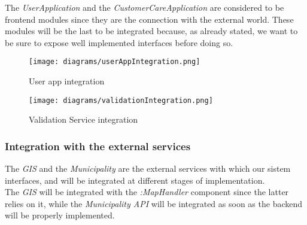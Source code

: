             The \emph{UserApplication} and the \emph{CustomerCareApplication} are considered to be frontend modules 
            since they are the connection with the external world. These modules will be the last to be integrated because, 
            as already stated, we want to be sure to expose well implemented interfaces before doing so.\\

            \begin{figure}[h]
                \centering
                \texttt{[image: diagrams/userAppIntegration.png]}
                \caption{
                    \label{fig:userAppIntegration} 
                    User app integration
                }
            \end{figure}
            \begin{figure}[h]
                \centering
                \texttt{[image: diagrams/validationIntegration.png]}
                \caption{
                    \label{fig:validationServiceIntegration} 
                    Validation Service integration
                }
            \end{figure}

        \subsubsection{Integration with the external services}
            
            The \emph{GIS} and the \emph{Municipality} are the external services with which our sistem interfaces, and will be
            integrated at different stages of implementation.\\
            The \emph{GIS} will be integrated with the \emph{:MapHandler} component since the latter relies on it, 
            while the \emph{Municipality API} will be integrated as soon as the backend will be properly implemented.


        


